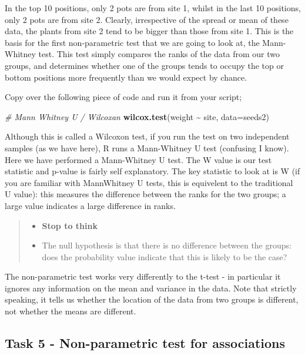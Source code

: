 \documentclass[
]{book}
\newenvironment{Shaded}{\begin{snugshade}}{\end{snugshade}}
\newcommand{\AttributeTok}[1]{\textcolor[rgb]{0.13,0.29,0.53}{#1}}
\newcommand{\CommentTok}[1]{\textcolor[rgb]{0.56,0.35,0.01}{\textit{#1}}}
\newcommand{\FunctionTok}[1]{\textcolor[rgb]{0.13,0.29,0.53}{\textbf{#1}}}
\newcommand{\NormalTok}[1]{#1}
\newcommand{\SpecialCharTok}[1]{\textcolor[rgb]{0.81,0.36,0.00}{\textbf{#1}}}
\providecommand{\tightlist}{%
  \setlength{\itemsep}{0pt}\setlength{\parskip}{0pt}}
\begin{document}
In the top 10 positions, only 2 pots are from site 1, whilst in the last 10 positions, only 2 pots are from site 2. Clearly, irrespective of the spread or mean of these data, the plants from site 2 tend to be bigger than those from site 1. This is the basis for the first non-parametric test that we are going to look at, the Mann-Whitney test. This test simply compares the ranks of the data from our two groups, and determines whether one of the groups tends to occupy the top or bottom positions more frequently than we would expect by chance.

Copy over the following piece of code and run it from your script;

\begin{Shaded}
\begin{Highlighting}[]
\CommentTok{\# Mann Whitney U / Wilcoxan }
\FunctionTok{wilcox.test}\NormalTok{(weight }\SpecialCharTok{\textasciitilde{}}\NormalTok{ site, }\AttributeTok{data=}\NormalTok{seeds2) }
\end{Highlighting}
\end{Shaded}

Although this is called a Wilcoxon test, if you run the test on two independent samples (as we have here), R runs a Mann-Whitney U test (confusing I know). Here we have performed a Mann-Whitney U test. The W value is our test statistic and p-value is fairly self explanatory. The key statistic to look at is W (if you are familiar with MannWhitney U tests, this is equivelent to the traditional U value): this measures the difference between the ranks for the two groups; a large value indicates a large difference in ranks.

\begin{quote}
\begin{itemize}
\tightlist
\item
  \textbf{Stop to think}
\item
  The null hypothesis is that there is no difference between the groups: does the probability value indicate that this is likely to be the case?
\end{itemize}
\end{quote}

The non-parametric test works very differently to the t-test - in particular it ignores any information on the mean and variance in the data. Note that strictly speaking, it tells us whether the location of the data from two groups is different, not whether the means are different.

\subsection{Task 5 - Non-parametric test for associations}\label{task-5---non-parametric-test-for-associations}
\end{document}
